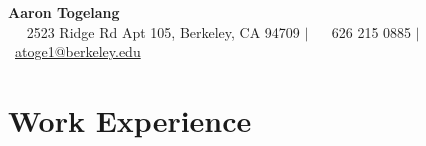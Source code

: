\documentclass[letterpaper, 10pt]{article}
\begin{document}

\begin{center}
  \huge{\textbf{Aaron Togelang}} \medskip \\
  \large{\ \normalsize{\faHome} \ 2523 Ridge Rd Apt 105, Berkeley, CA 94709 $|$ \ \normalsize{\faPhone} \ 626 215 0885 $|$ \ \normalsize{\faEnvelope} \ \href{mailto:atoge1@berkeley.edu}{atoge1@berkeley.edu}}
\end{center}


%
%


\section{Work Experience}
\end{document}
